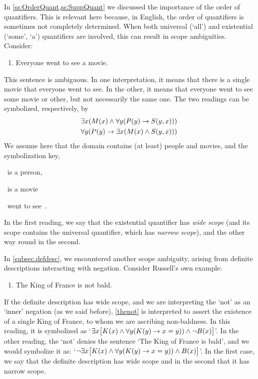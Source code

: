 In \cref{ss:OrderQuant,ss:SuppQuant} we discussed the importance of the order of quantifiers.  This is relevant here because, in English, the order of quantifiers is sometimes not completely determined.  When both universal (`all') and existential (`some', `a') quantifiers are  involved, this can result in scope ambiguities. Consider:
\begin{enumerate}
	\item\label{everya} Everyone went to see a movie.
\end{enumerate}
This sentence is ambiguous.  In one interpretation, it means that there is a single movie that everyone went to see. In the  other, it means that everyone went to see some movie or other, but not necessarily the same one. The two readings can be symbolized, respectively, by 
\begin{align*}
	& \exists x(M(x) \wedge \forall y(P(y) \rightarrow S(y,x)))\\
	& \forall y(P(y) \rightarrow \exists x(M(x) \wedge S(y,x)))
\end{align*}
We assume here that the domain contains (at least) people and movies, and the symbolization key,
\begin{ekey}
	\item[\atom{P}{y}] ~is a person, 
	\item[\atom{M}{x}] ~is a movie
	\item[\atom{S}{y,x}] ~went to see~.
\end{ekey}
In the first reading, we say that the existential quantifier has \emph{wide scope} (and its scope contains the universal quantifier, which has \emph{narrow scope}), and the other way round in the second.

In \cref{subsec.defdesc}, we encountered another scope ambiguity, arising from definite descriptions interacting with negation.  Consider Russell's own example:
\begin{enumerate}
	\item\label{thenot} The King of France is not bald.
\end{enumerate}
If the definite description has wide scope, and we are interpreting the `not' as an `inner' negation (as we said before), \cref*{thenot} is interpreted to assert the existence of a single King of France, to whom we are ascribing non-baldness. In this reading, it is symbolized as `$\exists x\bigl[K(x) \wedge \forall y(K(y) \rightarrow x=y)) \wedge \neg B(x)\bigr]$'. In the other reading, the `not' denies the sentence `The King of France is bald', and we would symbolize it as: `$\neg\exists x\bigl[K(x) \wedge \forall y(K(y) \rightarrow x=y)) \wedge B(x)\bigr]$'. In the first case, we say that the definite description has wide scope and in the second that it has narrow scope.


